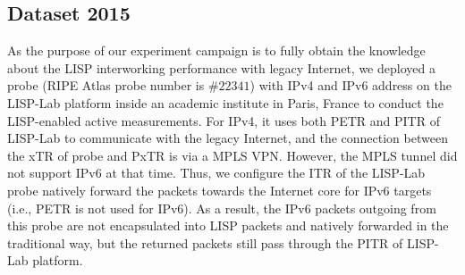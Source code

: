 \subsection{Dataset 2015}
\label{sec:pxtr_meth_2015}
As the purpose of our experiment campaign is to fully obtain the knowledge about the LISP interworking performance with legacy Internet, we deployed a probe (RIPE Atlas probe number is $\#22341$) with IPv4 and IPv6 address on the LISP-Lab platform inside an academic institute in Paris, France to conduct the LISP-enabled active measurements. For IPv4, it uses both PETR and PITR of LISP-Lab to communicate with the legacy Internet, and the connection between the xTR of probe and PxTR is via a MPLS VPN. However, the MPLS tunnel did not support IPv6 at that time. Thus, we configure the ITR of the LISP-Lab probe natively forward the packets towards the Internet core for IPv6 targets (i.e., PETR is not used for IPv6). As a result, the IPv6 packets outgoing from this probe are not encapsulated into LISP packets and natively forwarded in the traditional way, but the returned packets still pass through the PITR of LISP-Lab platform.

\begin{table}[!tb]
	\centering
	\caption{Different configurations of probes in 2015}
	\label{Probes_config_2015}{
	}
\end{table}

